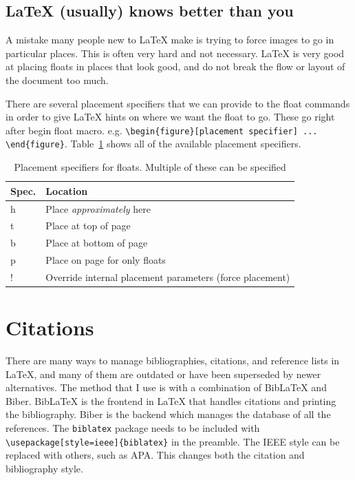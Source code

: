 \documentclass[11pt, twoside]{article}
\begin{document}
\subsection{\LaTeX{} (usually) knows better than you}
A mistake many people new to \LaTeX{} make is trying to force images to go in particular places. This is often very hard and not necessary. \LaTeX{} is very good at placing floats in places that look good, and do not break the flow or layout of the document too much.

There are several placement specifiers that we can provide to the float commands in order to give \LaTeX{} hints on where we want the float to go. These go right after begin float macro. e.g. \lstinline|\begin{figure}[placement specifier] ... \end{figure}|. Table~\ref{tab:placement-specs} shows all of the available placement specifiers.

\begin{table}
    \centering
    \caption{Placement specifiers for floats. Multiple of these can be specified}
    \label{tab:placement-specs}
    \begin{tabular}{ll}
        \toprule
        Spec. & Location                                                 \\
        \midrule
        h     & Place \emph{approximately} here                          \\
        t     & Place at top of page                                     \\
        b     & Place at bottom of page                                  \\
        p     & Place on page for only floats                            \\
        !     & Override internal placement parameters (force placement) \\
        \bottomrule
    \end{tabular}
\end{table}

\section{Citations}
There are many ways to manage bibliographies, citations, and reference lists in \LaTeX{}, and many of them are outdated or have been superseded by newer alternatives. The method that I use is with a combination of BibLaTeX and Biber. BibLaTeX is the frontend in \LaTeX{} that handles citations and printing the bibliography. Biber is the backend which manages the database of all the references. The \lstinline{biblatex} package needs to be included with \lstinline|\usepackage[style=ieee]{biblatex}| in the preamble. The IEEE style can be replaced with others, such as APA. This changes both the citation and bibliography style.
\end{document}
